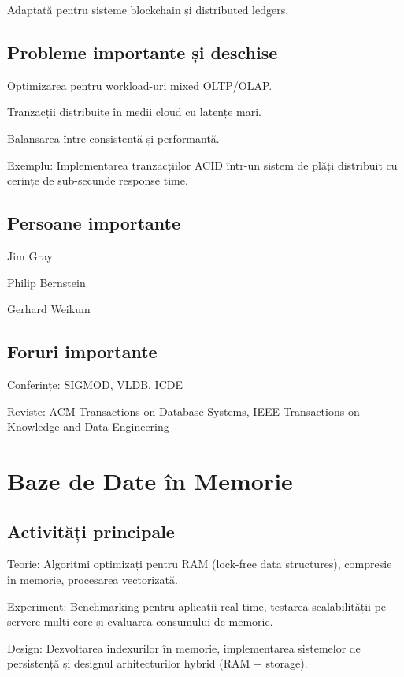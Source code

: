 \documentclass[12pt]{article}
\begin{document}
Adaptată pentru sisteme blockchain și distributed ledgers.

\subsection*{Probleme importante și deschise}

Optimizarea pentru workload-uri mixed OLTP/OLAP.

Tranzacții distribuite în medii cloud cu latențe mari.

Balansarea între consistență și performanță.

Exemplu: Implementarea tranzacțiilor ACID într-un sistem de plăți distribuit cu cerințe de sub-secunde response time.

\subsection*{Persoane importante}

Jim Gray

Philip Bernstein

Gerhard Weikum

\subsection*{Foruri importante}

Conferințe: SIGMOD, VLDB, ICDE

Reviste: ACM Transactions on Database Systems, IEEE Transactions on Knowledge and Data Engineering

\section{Baze de Date în Memorie}

\subsection*{Activități principale}

Teorie: Algoritmi optimizați pentru RAM (lock-free data structures), compresie în memorie, procesarea vectorizată.

Experiment: Benchmarking pentru aplicații real-time, testarea scalabilității pe servere multi-core și evaluarea consumului de memorie.

Design: Dezvoltarea indexurilor în memorie, implementarea sistemelor de persistență și designul arhitecturilor hybrid (RAM + storage).
\end{document}
